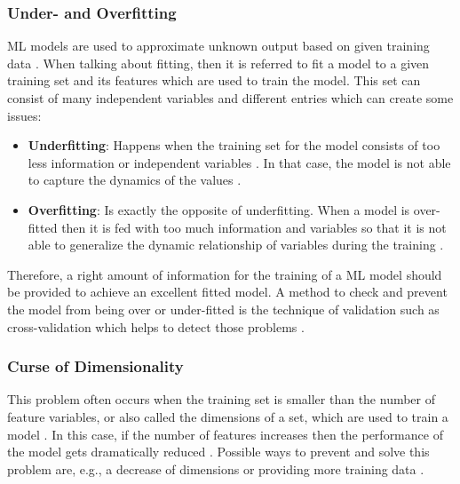 \documentclass[MGS,Master,english]{twbook}%
\begin{document}
\subsubsection{Under- and Overfitting}
\ac{ML} models are used to approximate unknown output based on given training data \cite{ml::book::algorithms}. When talking about fitting, then it is referred to fit a model to a given training set and its features which are used to train the model. This set can consist of many independent variables and different entries which can create some issues:
\begin{itemize}
	\item \textbf{Underfitting}: Happens when the training set for the model consists of too less information or independent variables \cite{ml::book::algorithms}. In that case, the model is not able to capture the dynamics of the values \cite{ml::book::algorithms}.
	\item \textbf{Overfitting}: Is exactly the opposite of underfitting. When a model is over-fitted then it is fed with too much information and variables so that it is not able to generalize the dynamic relationship of variables during the training \cite{ml::book::algorithms}.
\end{itemize}

Therefore, a right amount of information for the training of a \ac{ML} model should be provided to achieve an excellent fitted model. A method to check and prevent the model from being over or under-fitted is the technique of validation such as cross-validation which helps to detect those problems \cite{ml::book::algorithms}.

\subsubsection{Curse of Dimensionality}
This problem often occurs when the training set is smaller than the number of feature variables, or also called the dimensions of a set, which are used to train a model \cite{ml::book::algorithms}. In this case, if the number of features increases then the performance of the model gets dramatically reduced \cite{ml::book::algorithms}. Possible ways to prevent and solve this problem are, e.g., a decrease of dimensions or providing more training data \cite{ml::book::algorithms}.
\end{document}

